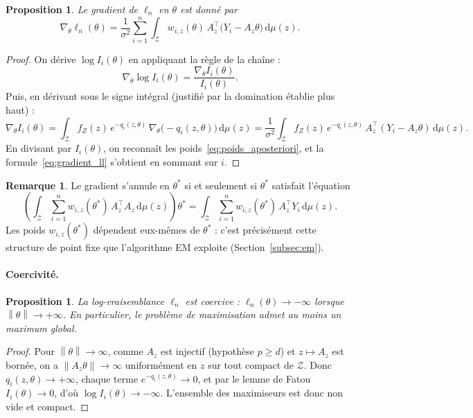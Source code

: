 \documentclass[12pt, a4paper]{article}
\newtheorem{proposition}[theorem]{Proposition}
\theoremstyle{definition}
\newtheorem{remark}[theorem]{Remarque}
\newcommand{\Zcal}{\mathcal{Z}}
\newcommand{\norm}[1]{\left\|#1\right\|}
\begin{document}
\begin{proposition}
\label{prop:gradient_ll}
Le gradient de $\ell_n$ en $\theta$ est donné par
\begin{equation}
    \nabla_\theta \ell_n(\theta)
    = \frac{1}{\sigma^2}
      \sum_{i=1}^{n} \int_\Zcal w_{i,z}(\theta)\,
      A_z^\top\bigl(Y_i - A_z\theta\bigr)\,\mathrm{d}\mu(z).
    \label{eq:gradient_ll}
\end{equation}
\end{proposition}

\begin{proof}
On dérive $\log I_i(\theta)$ en appliquant la règle de la chaîne :
\[
    \nabla_\theta \log I_i(\theta)
    = \frac{\nabla_\theta I_i(\theta)}{I_i(\theta)}.
\]
Puis, en dérivant sous le signe intégral (justifié par la domination établie plus haut) :
\[
    \nabla_\theta I_i(\theta)
    = \int_\Zcal f_Z(z)\, e^{-q_i(z,\theta)}\,
      \nabla_\theta\bigl(-q_i(z,\theta)\bigr)\,\mathrm{d}\mu(z)
    = \frac{1}{\sigma^2} \int_\Zcal f_Z(z)\, e^{-q_i(z,\theta)}\,
      A_z^\top(Y_i - A_z\theta)\,\mathrm{d}\mu(z).
\]
En divisant par $I_i(\theta)$, on reconnaît les poids~\eqref{eq:poids_aposteriori},
et la formule~\eqref{eq:gradient_ll} s'obtient en sommant sur $i$.
\end{proof}

\begin{remark}
Le gradient s'annule en $\theta^*$ si et seulement si $\theta^*$ satisfait
l'équation
\[
    \left(\int_\Zcal\!\sum_{i=1}^n w_{i,z}(\theta^*)\, A_z^\top A_z\,\mathrm{d}\mu(z)\right)\theta^*
    = \int_\Zcal\!\sum_{i=1}^n w_{i,z}(\theta^*)\, A_z^\top Y_i\,\mathrm{d}\mu(z).
\]
Les poids $w_{i,z}(\theta^*)$ dépendent eux-mêmes de $\theta^*$ : c'est
précisément cette structure de point fixe que l'algorithme EM exploite
(Section~\ref{subsec:em}).
\end{remark}

\paragraph{Coercivité.}

\begin{proposition}
La log-vraisemblance $\ell_n$ est coercive : $\ell_n(\theta) \to -\infty$ lorsque
$\norm{\theta} \to +\infty$. En particulier, le problème de maximisation admet
au moins un maximum global.
\end{proposition}

\begin{proof}
Pour $\norm{\theta} \to \infty$, comme $A_z$ est injectif (hypothèse $p \geq d$)
et $z \mapsto A_z$ est bornée, on a $\norm{A_z\theta} \to \infty$ uniformément en
$z$ sur tout compact de $\Zcal$. Donc $q_i(z,\theta) \to +\infty$, chaque terme
$e^{-q_i(z,\theta)} \to 0$, et par le lemme de Fatou $I_i(\theta) \to 0$, d'où
$\log I_i(\theta) \to -\infty$. L'ensemble des maximiseurs est donc non vide et
compact.
\end{proof}
\end{document}
